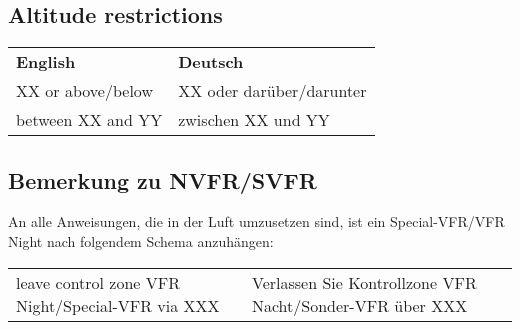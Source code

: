 \subsection{Altitude restrictions}
\begin{table}[H]
	\begin{tabularx}{\textwidth}{XX}
		\textbf{English} & \textbf{Deutsch} \\
		XX or above/below & XX oder darüber/darunter \\
		between XX and YY & zwischen XX und YY      
	\end{tabularx}%
\end{table}

\subsection{Bemerkung zu NVFR/SVFR}
An alle Anweisungen, die in der Luft umzusetzen sind, ist ein Special-VFR/VFR Night nach folgendem Schema anzuhängen:
\begin{table}[H]
	\begin{tabularx}{\textwidth}{XX}
		
		leave control zone VFR Night/Special-VFR via XXX&Verlassen Sie Kontrollzone VFR Nacht/Sonder-VFR über XXX
	\end{tabularx}%
\end{table}


